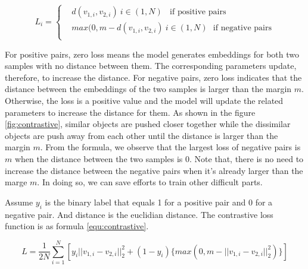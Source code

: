 \begin{equation}
L_i = \left\{
\begin{aligned}
 & d(v_{1,i}, v_{2,i}) \ i \in (1, N) \ \ \ \ \text{if positive pairs} \\
 & max(0, m - d(v_{1,i}, v_{2,i}) \   i \in (1, N) \ \  \  \text{if negative pairs} \\
\end{aligned}
\right.
\label{equ:loss}
\end{equation}

For positive pairs, zero loss means the model generates embeddings for both two samples with no distance between them. The corresponding parameters update, therefore, to increase the distance. For negative pairs, zero loss indicates that the distance between the embeddings of the two samples is larger than the margin $m$. Otherwise, the loss is a positive value and the model will update the related parameters to increase the distance for them. As shown in the figure \ref{fig:contrastive}, similar objects are pushed closer together while the dissimilar objects are push away from each other until the distance is larger than the margin $m$. From the formula, we observe that the largest loss of negative pairs is $m$ when the distance between the two samples is 0. Note that, there is no need to increase the distance between the negative pairs when it's already larger than the marge $m$. In doing so, we can save efforts to train other difficult parts. 

Assume $y_i$ is the binary label that equals 1 for a positive pair and 0 for a negative pair. And distance is the euclidian distance. The contrastive loss function is as formula \ref{equ:contrastive}.

\begin{equation}
L = \frac{1}{2N}\sum_{i=1}^{N}[y_i || v_{1,i} - v_{2,i} ||_2^2 +  (1 - y_i)\{ max(0, m - ||v_{1,i} - v_{2,i}||_2^2) \}]
\label{equ:contrastive}
\end{equation}

